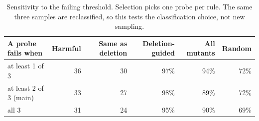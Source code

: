 \begin{table}[t]
\centering\footnotesize\setlength{\tabcolsep}{4pt}
\caption{Sensitivity to the failing threshold. Selection picks one probe per rule. The same three samples are reclassified, so this tests the classification choice, not new sampling.}\label{tab:thresholds}
\begin{tabular}{lrrrrr}
\toprule
A probe fails when & Harmful & Same as deletion & Deletion-guided & All mutants & Random \\
\midrule
at least 1 of 3 & 36 & 30 & 97\% & 94\% & 72\% \\
at least 2 of 3 (main) & 33 & 27 & 98\% & 89\% & 72\% \\
all 3 & 31 & 24 & 95\% & 90\% & 69\% \\
\bottomrule
\end{tabular}
\end{table}
